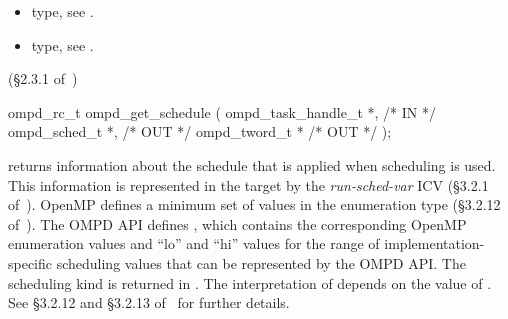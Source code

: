 \argdesc

\crossreferences
\begin{itemize}
	\item {} type, see .
	\item {} type, see .
\end{itemize}
(\S2.3.1 of~\cite{OpenMP})


%	
%	

%
\summary

\format
\cspecificstart
\begin{boxedcode}
ompd\_rc\_t ompd\_get\_schedule (
  ompd\_task\_handle\_t        *,                           /* IN */
  ompd\_sched\_t              *,                                 /* OUT */
  ompd\_tword\_t              *                              /* OUT */
); 
\end{boxedcode}
\cspecificend

\descr

 returns information about the schedule that is
applied when  scheduling is used.
%
This information is represented in the target by the
\emph{run-sched-var} ICV (\S3.2.1 of~\cite{OpenMP}).
\argdesc
OpenMP defines a minimum set of values in the enumeration type
 (\S3.2.12 of~\cite{OpenMP}).
%
The OMPD API defines
, which contains the
corresponding OpenMP enumeration values and ``lo'' and ``hi'' values
for the range of implementation-specific scheduling values that can be
represented by the OMPD API.
%
The scheduling kind is returned in .
%
The interpretation of  depends on the value of
.
%
See \S3.2.12 and \S3.2.13 of~\cite{OpenMP} for further details.


